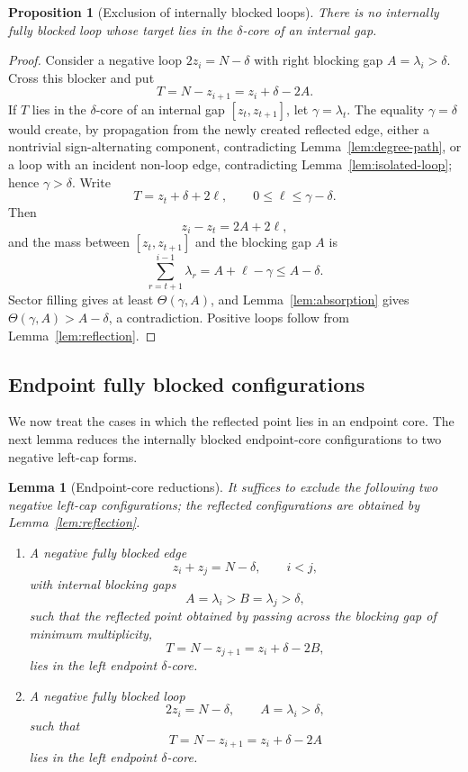 \documentclass[11pt]{article}
\newtheorem{lemma}[theorem]{Lemma}
\newtheorem{proposition}[theorem]{Proposition}
\begin{document}
\begin{proposition}[Exclusion of internally blocked loops]\label{prop:internal-loop}
There is no internally fully blocked loop whose target lies in the $\delta$-core of an internal gap.
\end{proposition}

\begin{proof}
Consider a negative loop $2z_i=N-\delta$ with right blocking gap $A=\lambda_i>\delta$.  Cross this blocker and put
\[
        T=N-z_{i+1}=z_i+\delta-2A.
\]
If $T$ lies in the $\delta$-core of an internal gap $[z_t,z_{t+1}]$, let $\gamma=\lambda_t$.  The equality $\gamma=\delta$ would create, by propagation from the newly created reflected edge, either a nontrivial sign-alternating component, contradicting Lemma~\ref{lem:degree-path}, or a loop with an incident non-loop edge, contradicting Lemma~\ref{lem:isolated-loop}; hence $\gamma>\delta$.  Write
\[
        T=z_t+\delta+2\ell,
        \qquad 0\le \ell\le\gamma-\delta.
\]
Then
\[
        z_i-z_t=2A+2\ell,
\]
and the mass between $[z_t,z_{t+1}]$ and the blocking gap $A$ is
\[
        \sum_{r=t+1}^{i-1}\lambda_r
        =A+\ell-\gamma
        \le A-\delta.
\]
Sector filling gives at least $\Theta(\gamma,A)$, and Lemma~\ref{lem:absorption} gives $\Theta(\gamma,A)>A-\delta$, a contradiction.  Positive loops follow from Lemma~\ref{lem:reflection}.
\end{proof}

\subsection{Endpoint fully blocked configurations}

We now treat the cases in which the reflected point lies in an endpoint core.  The next lemma reduces the internally blocked endpoint-core configurations to two negative left-cap forms.

\begin{lemma}[Endpoint-core reductions]\label{lem:endpoint-core-reductions}
It suffices to exclude the following two negative left-cap configurations; the reflected configurations are obtained by Lemma~\ref{lem:reflection}.
\begin{enumerate}
\item A negative fully blocked edge
\[
        z_i+z_j=N-\delta,
        \qquad i<j,
\]
with internal blocking gaps
\[
        A=\lambda_i>B=\lambda_j>\delta,
\]
such that the reflected point obtained by passing across the blocking gap of minimum multiplicity,
\[
        T=N-z_{j+1}=z_i+\delta-2B,
\]
lies in the left endpoint \(\delta\)-core.
\item A negative fully blocked loop
\[
        2z_i=N-\delta,
        \qquad A=\lambda_i>\delta,
\]
such that
\[
        T=N-z_{i+1}=z_i+\delta-2A
\]
lies in the left endpoint \(\delta\)-core.
\end{enumerate}
\end{lemma}
\end{document}

